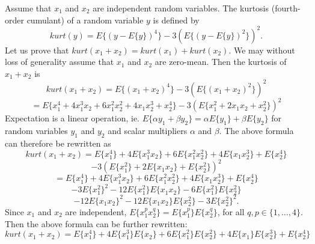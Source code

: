 \documentclass[10pt]{article}
\begin{document}
\begin{enumerate}
Assume that $x_1$ and $x_2$ are independent random variables.
  The kurtosis (fourth-order cumulant) of a random variable $y$ is defined by
  \begin{displaymath}
  kurt(y) = E\{(y-E\{y\})^4\}-3(E\{(y-E\{y\})^2\})^2 .
  \end{displaymath}
  Let us prove that $kurt(x_1+x_2)=kurt(x_1)+kurt(x_2)$.
  We may without loss of generality assume that $x_1$ and $x_2$ are zero-mean.
  Then the kurtosis of $x_1+x_2$ is
  \begin{displaymath}
  kurt(x_1+x_2)
  = E\{(x_1+x_2)^4\}-3(E\{(x_1+x_2)^2\})^2
  \end{displaymath}
  \begin{displaymath}
  = E\{x_1^4 + 4 x_1^3 x_2 + 6 x_1^2 x_2^2 + 4 x_1 x_2^3 + x_2^4\}
   -3(E\{x_1^2 + 2 x_1 x_2 + x_2^2\})^2
  \end{displaymath}
  Expectation is a linear operation,
  ie. $E\{\alpha y_1+ \beta y_2\}=\alpha E\{y_1\}+ \beta E\{y_2\}$ for random variables
  $y_1$ and $y_2$ and scalar multipliers $\alpha$ and $\beta$.
  The above formula can therefore be rewritten as
  \begin{displaymath}
  kurt(x_1+x_2)
  = E\{x_1^4\} + 4 E\{x_1^3 x_2\} + 6 E\{x_1^2 x_2^2\} + 4 E\{x_1 x_2^3\} + E\{x_2^4\}
  \end{displaymath}
  \begin{displaymath}
   -3(E\{x_1^2\} + 2 E\{x_1 x_2\} + E\{x_2^2\})^2
  \end{displaymath}
  \begin{displaymath}
  = E\{x_1^4\} + 4 E\{x_1^3 x_2\} + 6 E\{x_1^2 x_2^2\} + 4 E\{x_1 x_2^3\} + E\{x_2^4\}
  \end{displaymath}
  \begin{displaymath}
   -3 E\{x_1^2\}^2 -12 E\{x_1^2\} E\{x_1 x_2\} -6 E\{x_1^2\} E\{x_2^2\}
  \end{displaymath}
  \begin{displaymath}
   -12 E\{x_1 x_2\}^2 -12 E\{x_1 x_2\} E\{x_2^2\} -3 E\{x_2^2\}^2 .
  \end{displaymath}
  Since $x_1$ and $x_2$ are independent,
  $E\{x_1^p x_2^q\} = E\{x_1^p\} E\{x_2^q\}$, for all $q,p \in \{1,\ldots,4\}$.
  Then the above formula can be further rewritten:
  \begin{displaymath}
  kurt(x_1+x_2)
  = E\{x_1^4\} + 4 E\{x_1^3\}E\{x_2\} + 6 E\{x_1^2\}E\{x_2^2\} + 4 E\{x_1\}E\{x_2^3\}
  + E\{x_2^4\}
  \end{displaymath}
  \begin{displaymath}

\end{displaymath}
\end{enumerate}
\end{document}
